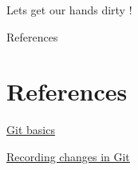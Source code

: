\documentclass{beamer}
\begin{document}
\begin{frame}
	\begin{center}
		\Huge Lets get our hands dirty !
	\end{center}
\end{frame}

\begin{frame}{References}
  \section{References}
    
  \begin{thebibliography}{10}

	\href{https://git-scm.com/book/en/v2/Getting-Started-Git-Basics}{Git basics}
	
	\href{https://git-scm.com/book/en/v2/Git-Basics-Recording-Changes-to-the-Repository}{Recording changes in Git}
	
	

  \end{thebibliography}
\end{frame}
\end{document}
